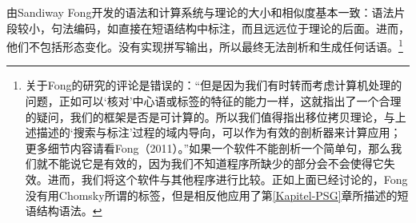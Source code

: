 由Sandiway Fong开发的语法和计算系统与理论的大小和相似度基本一致\citep{FG2012a,Fong2014a}：语法片段较小，句法编码，如直接在短语结构中标注\citep[\S~4]{FG2012a}，而且远远位于\xbarc 理论的后面。进而，他们不包括形态变化。没有实现拼写输出，所以最终无法剖析和生成任何话语。\footnote{%
 \citet*[]{BPYC2011a}关于Fong的研究的评论是错误的：“但是因为我们有时转而考虑计算机处理的问题，正如可以‘核对’中心语或标签的特征的能力一样，这就指出了一个合理的疑问，我们的框架是否是可计算的。所以我们值得指出移位拷贝理论，与上述描述的‘搜索与标注’过程的域内导向，可以作为有效的剖析器来计算应用；更多细节内容请看Fong（2011）。”如果一个软件不能剖析一个简单句，那么我们就不能说它是有效的，因为我们不知道程序所缺少的部分会不会使得它失效。进而，我们将这个软件与其他程序进行比较。正如上面已经讨论的，Fong没有用Chomsky所谓的标签，但是相反他应用了第\ref{Kapitel-PSG}章所描述的短语结构语法。
}
